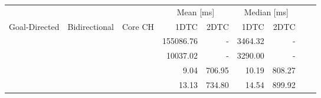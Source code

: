 \begin{tabular}{cccrrrrrr}
	\toprule
	              &               &         & \multicolumn{2}{c}{Mean [\si{\milli\second}]} & \multicolumn{2}{c}{Median [\si{\milli\second}]}               \\
	Goal-Directed & Bidirectional & Core CH & 1DTC                                          & 2DTC                                            & 1DTC & 2DTC \\
	\midrule
	\cmark        & \xmark        & \xmark  & 155086.76                                             & -                                               & 3464.32    & -    \\
	\cmark        & \cmark        & \xmark  & 10037.02                                             & -                                               & 3290.00    & -    \\
	\xmark        & \cmark        & \cmark  & 9.04                                             & 706.95                                               & 10.19    & 808.27    \\
	\cmark        & \cmark        & \cmark  & 13.13                                             & 734.80                                               & 14.54    & 899.92    \\
	\bottomrule
\end{tabular}